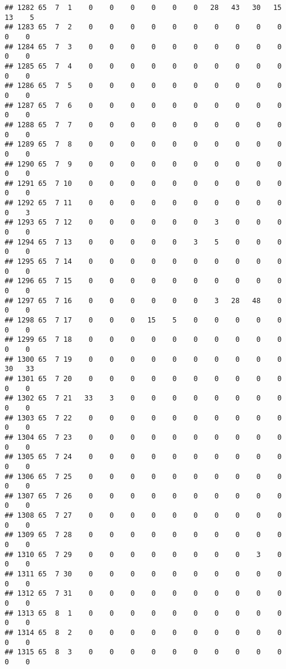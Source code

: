 \documentclass[]{article}
\begin{document}
\begin{verbatim}
## 1282 65  7  1    0    0    0    0    0    0   28   43   30   15   13    5
## 1283 65  7  2    0    0    0    0    0    0    0    0    0    0    0    0
## 1284 65  7  3    0    0    0    0    0    0    0    0    0    0    0    0
## 1285 65  7  4    0    0    0    0    0    0    0    0    0    0    0    0
## 1286 65  7  5    0    0    0    0    0    0    0    0    0    0    0    0
## 1287 65  7  6    0    0    0    0    0    0    0    0    0    0    0    0
## 1288 65  7  7    0    0    0    0    0    0    0    0    0    0    0    0
## 1289 65  7  8    0    0    0    0    0    0    0    0    0    0    0    0
## 1290 65  7  9    0    0    0    0    0    0    0    0    0    0    0    0
## 1291 65  7 10    0    0    0    0    0    0    0    0    0    0    0    0
## 1292 65  7 11    0    0    0    0    0    0    0    0    0    0    0    3
## 1293 65  7 12    0    0    0    0    0    0    3    0    0    0    0    0
## 1294 65  7 13    0    0    0    0    0    3    5    0    0    0    0    0
## 1295 65  7 14    0    0    0    0    0    0    0    0    0    0    0    0
## 1296 65  7 15    0    0    0    0    0    0    0    0    0    0    0    0
## 1297 65  7 16    0    0    0    0    0    0    3   28   48    0    0    0
## 1298 65  7 17    0    0    0   15    5    0    0    0    0    0    0    0
## 1299 65  7 18    0    0    0    0    0    0    0    0    0    0    0    0
## 1300 65  7 19    0    0    0    0    0    0    0    0    0    0   30   33
## 1301 65  7 20    0    0    0    0    0    0    0    0    0    0    0    0
## 1302 65  7 21   33    3    0    0    0    0    0    0    0    0    0    0
## 1303 65  7 22    0    0    0    0    0    0    0    0    0    0    0    0
## 1304 65  7 23    0    0    0    0    0    0    0    0    0    0    0    0
## 1305 65  7 24    0    0    0    0    0    0    0    0    0    0    0    0
## 1306 65  7 25    0    0    0    0    0    0    0    0    0    0    0    0
## 1307 65  7 26    0    0    0    0    0    0    0    0    0    0    0    0
## 1308 65  7 27    0    0    0    0    0    0    0    0    0    0    0    0
## 1309 65  7 28    0    0    0    0    0    0    0    0    0    0    0    0
## 1310 65  7 29    0    0    0    0    0    0    0    0    3    0    0    0
## 1311 65  7 30    0    0    0    0    0    0    0    0    0    0    0    0
## 1312 65  7 31    0    0    0    0    0    0    0    0    0    0    0    0
## 1313 65  8  1    0    0    0    0    0    0    0    0    0    0    0    0
## 1314 65  8  2    0    0    0    0    0    0    0    0    0    0    0    0
## 1315 65  8  3    0    0    0    0    0    0    0    0    0    0    0    0

\end{verbatim}
\end{document}

